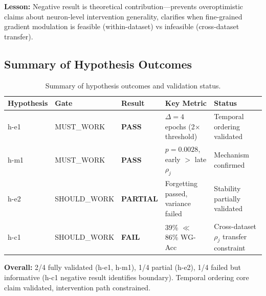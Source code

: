 \textbf{Lesson:} Negative result is theoretical contribution---prevents overoptimistic claims about neuron-level intervention generality, clarifies when fine-grained gradient modulation is feasible (within-dataset) vs infeasible (cross-dataset transfer).

\subsection{Summary of Hypothesis Outcomes}

\begin{table}[h]
\centering
\small
\begin{tabular}{@{}llllp{4cm}@{}}
\toprule
\textbf{Hypothesis} & \textbf{Gate} & \textbf{Result} & \textbf{Key Metric} & \textbf{Status} \\
\midrule
h-e1 & MUST\_WORK & \textbf{PASS} & $\Delta = 4$ epochs (2$\times$ threshold) & Temporal ordering validated \\
h-m1 & MUST\_WORK & \textbf{PASS} & $p = 0.0028$, early $>$ late $\rho_j$ & Mechanism confirmed \\
h-e2 & SHOULD\_WORK & \textbf{PARTIAL} & Forgetting passed, variance failed & Stability partially validated \\
h-c1 & SHOULD\_WORK & \textbf{FAIL} & 39\% $\ll$ 86\% WG-Acc & Cross-dataset $\rho_j$ transfer constraint \\
\bottomrule
\end{tabular}
\caption{Summary of hypothesis outcomes and validation status.}
\label{tab:hypothesis_summary}
\end{table}

\textbf{Overall:} 2/4 fully validated (h-e1, h-m1), 1/4 partial (h-e2), 1/4 failed but informative (h-c1 negative result identifies boundary). Temporal ordering core claim validated, intervention path constrained.
